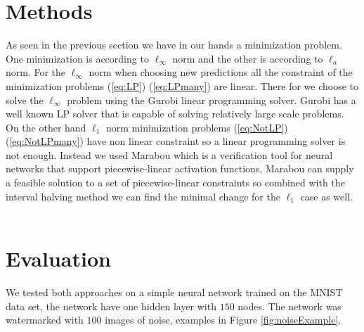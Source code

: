 \documentclass[a4paper]{easychair}
\newcommand{\guy}[1]{\marginpar{\textcolor{orange}{Guy: #1}}}
\begin{document}
\section{Methods}
\label{sec:methods}

\guy{In this section, explain how the stuff from section 3 can be
  applied to watermarks and network corrections}

As seen in the previous section we have in our hands a minimization problem. One minimization is according to $\ell_\infty$ norm and the other is according to $\ell_a$ norm.
For the $\ell_\infty$ norm when choosing new predictions all the constraint of the minimization problems (\ref{eq:LP}) (\ref{eq:LPmany}) are linear. There for we choose to solve the $\ell_\infty$ problem using the Gurobi linear programming solver. Gurobi has a well known LP solver that is capable of solving relatively large scale problems.
On the other hand $\ell_1$ norm minimization problems (\ref{eq:NotLP}) (\ref{eq:NotLPmany}) have non linear constraint so a linear programming solver is not enough. Instead we used Marabou which is a verification tool for neural networks that support piecewise-linear activation functions, Marabou can supply a feasible solution to a set of piecewise-linear constraints so combined with the interval halving method we can find the minimal change for the $\ell_1$ case as well. 
\\\\

\section{Evaluation}
\label{sec:evaluation}

We tested both approaches on a simple neural network trained on the MNIST data set, the network have one hidden layer with $150$ nodes. The network was watermarked with $100$ images of noise, examples in Figure \ref{fig:noiseExample}.
\end{document}
